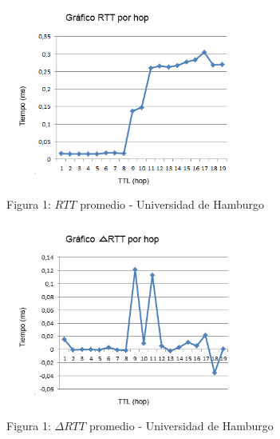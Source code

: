 \begin{figure}[h]
	\begin{center}
    \includegraphics[width=0.7\textwidth]{img_analisis3/grafico-rtt-promedio.jpg} 
    \caption{Figura 1: $RTT$ promedio - Universidad de Hamburgo}	
	\end{center} 
\end{figure}

\begin{figure}[h]
	\begin{center}
    \includegraphics[width=0.7\textwidth]{img_analisis3/grafico-delta-rtt-promedio.jpg} 
    \caption{Figura 1: $\Delta RTT$ promedio - Universidad de Hamburgo}	
	\end{center} 
\end{figure}
\newpage


